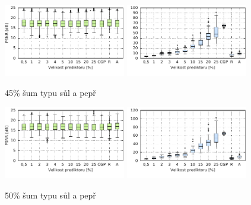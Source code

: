 \begin{figure}[H]
    \centering
    \includegraphics[width=0.475\textwidth]{fig/plot/compare/saltpepper45-100kg-psnrtest.pdf}
    \hskip0.5cm
    \includegraphics[width=0.475\textwidth]{fig/plot/compare/saltpepper45-100kg-usertime.pdf}
    \caption{45\% šum typu sůl a pepř}
\end{figure}

\begin{figure}[H]
    \centering
    \includegraphics[width=0.475\textwidth]{fig/plot/compare/saltpepper50-100kg-psnrtest.pdf}
    \hskip0.5cm
    \includegraphics[width=0.475\textwidth]{fig/plot/compare/saltpepper50-100kg-usertime.pdf}
    \caption{50\% šum typu sůl a pepř}
\end{figure}


